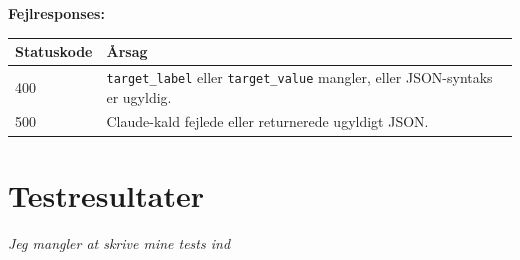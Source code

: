 \documentclass[12pt, a4paper, oneside]{report}
\begin{document}
\textbf{Fejlresponses:}

\begin{table}[H]
\centering
\begin{tabularx}{\textwidth}{lX}
\toprule
\textbf{Statuskode} & \textbf{Årsag} \\
\midrule
400 & \texttt{target\_label} eller \texttt{target\_value} mangler, eller JSON-syntaks er ugyldig. \\
500 & Claude-kald fejlede eller returnerede ugyldigt JSON. \\
\bottomrule
\end{tabularx}
\end{table}

\chapter{Testresultater}
\label{app:tests}

\textit{Jeg mangler at skrive mine tests ind}
\end{document}
